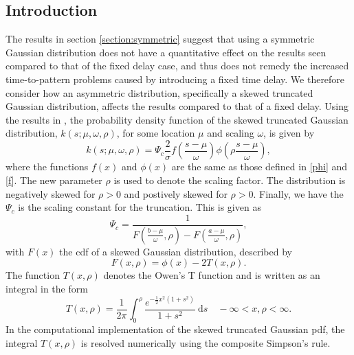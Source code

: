 \subsection{Introduction}
The results in section \ref{section:symmetric} suggest that using a symmetric Gaussian distribution does not have a quantitative effect on the results seen compared to that of the fixed delay case, and thus does not remedy the increased time-to-pattern problems caused by introducing a fixed time delay. We therefore consider how an asymmetric distribution, specifically a skewed truncated Gaussian distribution, affects the results compared to that of a fixed delay. Using the results in \cite{skewed}, the probability density function of the skewed truncated Gaussian distribution, $k(s;\mu,\omega,\rho)$, for some location $\mu$ and scaling $\omega$, is given by
\begin{equation}
    k(s;\mu,\omega,\rho)=\Psi_c\frac{2}{\sigma}f\left(\frac{s-\mu}{\omega}\right)\phi\left(\rho\frac{s-\mu}{\omega}\right),
\end{equation}
where the functions $f(x)$ and $\phi(x)$ are the same as those defined in \eqref{phi} and \eqref{f}. The new parameter $\rho$ is used to denote the scaling factor. The distribution is negatively skewed for $\rho>0$ and postively skewed for $\rho>0$. Finally, we have the $\Psi_c$ is the scaling constant for the truncation. This is given as
\begin{equation}
    \Psi_c=\frac{1}{F\left(\frac{b-\mu}{\omega},\rho\right)-F\left(\frac{a-\mu}{\omega},\rho\right)},
\end{equation}
with $F(x)$ the cdf of a skewed Gaussian distribution, described by
\begin{equation}
    F(x,\rho)=\phi(x)-2T(x,\rho).
\end{equation}
The function $T(x,\rho)$ denotes the Owen's T function \cite{owenst} and is written as an integral in the form
\begin{equation}
    T(x,\rho)=\frac{1}{2\pi}\int_0^\rho\frac{e^{-\frac{1}{2}x^2(1+s^2)}}{1+s^2}\ \text{d}s\quad -\infty<x,\rho<\infty.
\end{equation}
In the computational implementation of the skewed truncated Gaussian pdf, the integral $T(x,\rho)$ is resolved numerically using the composite Simpson's rule.

